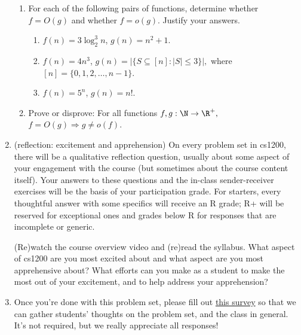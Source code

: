 \documentclass[11pt]{article}
\begin{document}
\begin{enumerate}
\begin{enumerate}
    \item For each of the following pairs of functions, determine whether $f=O(g)$ and whether $f=o(g)$.  Justify your answers.
    \begin{enumerate}
        \item $f(n) = 3\log_2^3 n$, $g(n) = n^2+1$.
        \item $f(n) = 4n^3$, $g(n)= \left| \{S \subseteq [n] : |S|\leq 3\}\right|,$ where $[n]=\{0,1,2,\ldots,n-1\}$.  
        \item $f(n) = 5^n$, $g(n)=n!$.
    \end{enumerate}

    \item Prove or disprove: For all functions $f,g : \N\rightarrow \R^+,$ $f=O(g) \Rightarrow g\neq o(f)$.
\end{enumerate}

\item (reflection: excitement and apprehension)  On every problem set in cs1200, there will be a qualitative reflection question, usually about some aspect of your engagement with the course (but sometimes about the course content itself). Your answers to these questions and the in-class sender-receiver exercises will be the basis of your participation grade.  For starters, every thoughtful answer with some specifics will receive an R grade; R+ will be reserved for exceptional ones and grades below R for responses that are incomplete or generic.

(Re)watch the course overview video and (re)read the syllabus.  What aspect of cs1200 are you most excited about and what aspect are you most apprehensive about?  What efforts can you make as a student to make the most out of your excitement, and to help address your apprehension?

\item Once you're done with this problem set, please fill out \href{https://forms.gle/yLptjrB15sRm1c679}{this survey} so that we can gather students' thoughts on the problem set, and the class in general. It's not required, but we really appreciate all responses!
\end{enumerate}
\end{document}
